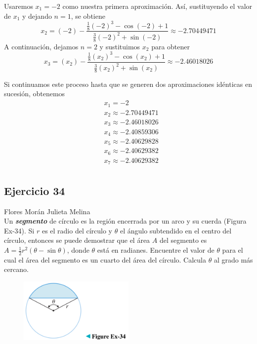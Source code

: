 \documentclass[12pt]{article}
\begin{document}
Usaremos $x_1=-2$ como nuestra primera aproximación. Así, sustituyendo el valor de $x_1$ y dejando $n = 1$, se obtiene
\[
x_2 = (-2)-\frac{\frac{1}{8}(-2)^3-\cos{(-2)}+1}{\frac{3}{8}(-2)^2+\sin{(-2)}} \approx -2.70449471
\]
A continuación, dejamos $n = 2$ y sustituimos $x_2$ para obtener
\[
x_3 = (x_2)-\frac{\frac{1}{8}(x_2)^3-\cos{(x_2)}+1}{\frac{3}{8}(x_2)^2+\sin{(x_2)}} \approx -2.46018026
\]

Si continuamos este proceso hasta que se generen dos aproximaciones idénticas en sucesión, obtenemos
\begin{align*}
  & x_1 = -2 \\
  & x_2 \approx -2.70449471 \\
  & x_3 \approx -2.46018026 \\
  & x_4 \approx -2.40859306 \\
  & x_5 \approx -2.40629828 \\
  & x_6 \approx -2.40629382 \\
  & x_7 \approx -2.40629382 \\
\end{align*}

\subsection{Ejercicio 34} Flores Morán Julieta Melina \\

Un \textit{\textbf{segmento}} de círculo es la región encerrada por un arco y su cuerda (Figura Ex-34). Si $r$ es el radio del círculo y $\theta$ el ángulo subtendido en el centro del círculo, entonces se puede demostrar que el área $A$ del segmento es $A = \frac{1}{2} r^2 (\theta - \sin{\theta})$, donde $\theta$ está en radianes. Encuentre el valor de $\theta$ para el cual el área del segmento es un cuarto del área del círculo. Calcula $\theta$ al grado más cercano.

\begin{figure}[H]
\centering
\includegraphics[width=0.5\textwidth]{../img/img_Lista3/3_34.png}
\end{figure}
\end{document}
